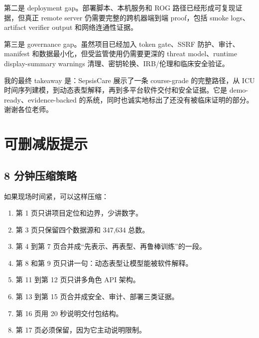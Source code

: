 \documentclass[11pt,a4paper]{article}
\begin{document}
第二是 deployment gap。部署脚本、本机服务和 ROG 路径已经形成可复现证据，但真正 remote server 仍需要完整的跨机器端到端 proof，包括 smoke logs、artifact verifier output 和网络连通性证据。

第三是 governance gap。虽然项目已经加入 token gate、SSRF 防护、审计、manifest 和数据最小化，但受监管使用仍需要更深的 threat model、runtime display-summary warnings 清理、密钥轮换、IRB/伦理和临床安全验证。

我的最终 takeaway 是：SepsisCare 展示了一条 course-grade 的完整路径，从 ICU 时间序列建模，到动态表型解释，再到多平台软件交付和安全证据。它是 demo-ready、evidence-backed 的系统，同时也诚实地标出了还没有被临床证明的部分。谢谢各位老师。

\section{可删减版提示}

\subsection*{8 分钟压缩策略}
如果现场时间紧，可以这样压缩：
\begin{enumerate}
  \item 第 1 页只讲项目定位和边界，少讲数字。
  \item 第 3 页只保留四个数据源和 347,634 总数。
  \item 第 4 到第 7 页合并成“先表示、再表型、再鲁棒训练”的一段。
  \item 第 8 和第 9 页只讲一句：动态表型让模型能被软件解释。
  \item 第 11 到第 12 页只讲多角色 API 架构。
  \item 第 13 到第 15 页合并成安全、审计、部署三类证据。
  \item 第 16 页用 20 秒说明交付包结构。
  \item 第 17 页必须保留，因为它主动说明限制。
\end{enumerate}
\end{document}
